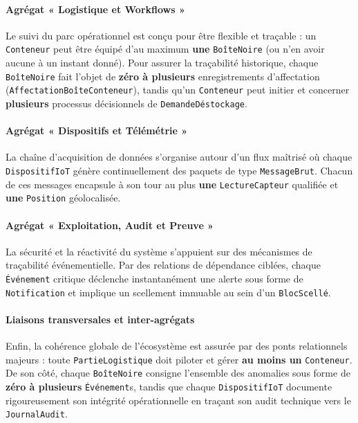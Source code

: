 \paragraph{Agrégat « Logistique et Workflows »}
Le suivi du parc opérationnel est conçu pour être flexible et traçable : un \texttt{Conteneur} peut être équipé d'au maximum \textbf{une} \texttt{BoîteNoire} (ou n'en avoir aucune à un instant donné). Pour assurer la traçabilité historique, chaque \texttt{BoîteNoire} fait l'objet de \textbf{zéro à plusieurs} enregistrements d'affectation (\texttt{AffectationBoîteConteneur}), tandis qu'un \texttt{Conteneur} peut initier et concerner \textbf{plusieurs} processus décisionnels de \texttt{DemandeDéstockage}.

\paragraph{Agrégat « Dispositifs et Télémétrie »}
La chaîne d'acquisition de données s'organise autour d'un flux maîtrisé où chaque \texttt{DispositifIoT} génère continuellement des paquets de type \texttt{MessageBrut}. Chacun de ces messages encapsule à son tour au plus \textbf{une} \texttt{LectureCapteur} qualifiée et \textbf{une} \texttt{Position} géolocalisée.

\paragraph{Agrégat « Exploitation, Audit et Preuve »}
La sécurité et la réactivité du système s'appuient sur des mécanismes de traçabilité événementielle. Par des relations de dépendance ciblées, chaque \texttt{Événement} critique déclenche instantanément une alerte sous forme de \texttt{Notification} et implique un scellement immuable au sein d'un \texttt{BlocScellé}.

\paragraph{Liaisons transversales et inter-agrégats}
Enfin, la cohérence globale de l'écosystème est assurée par des ponts relationnels majeurs : toute \texttt{PartieLogistique} doit piloter et gérer \textbf{au moins un} \texttt{Conteneur}. De son côté, chaque \texttt{BoîteNoire} consigne l'ensemble des anomalies sous forme de \textbf{zéro à plusieurs} \texttt{Événement}s, tandis que chaque \texttt{DispositifIoT} documente rigoureusement son intégrité opérationnelle en traçant son audit technique vers le \texttt{JournalAudit}.


